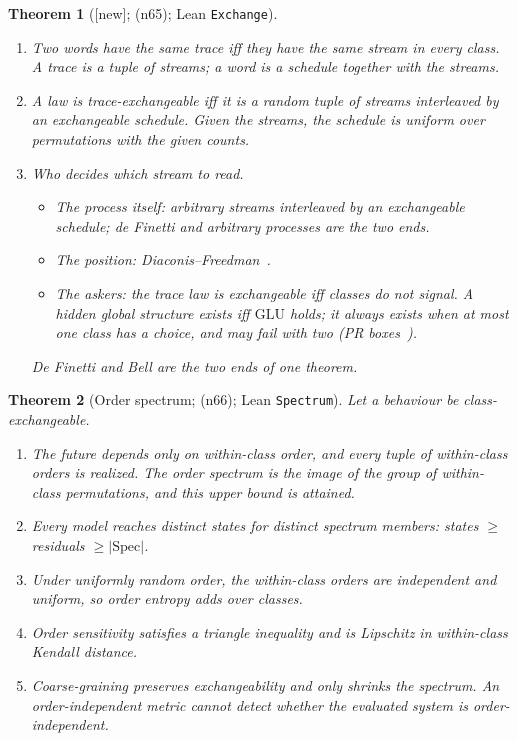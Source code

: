 \documentclass[11pt]{article}
\newtheorem{theorem}{Theorem}[section]
\theoremstyle{definition}
\theoremstyle{remark}
\newcommand{\GLU}{\mathrm{GLU}}
\newcommand{\lean}[1]{\texttt{#1}}
\newcommand{\status}[1]{\textsf{[#1]}}
\newcommand{\note}[1]{\textsf{(n#1)}}
\begin{document}
\begin{theorem}[\status{new}; \note{65}; Lean \lean{Exchange}]\label{thm:repr}
\leavevmode
\begin{enumerate}
\item Two words have the same trace iff they have the same stream in every class. A trace is a tuple of streams; a word is a schedule together with the streams.
\item A law is trace-exchangeable iff it is a random tuple of streams interleaved by an exchangeable schedule. Given the streams, the schedule is uniform over permutations with the given counts.
\item \emph{Who decides which stream to read.}
  \begin{itemize}
  \item The process itself: arbitrary streams interleaved by an exchangeable schedule; de Finetti and arbitrary processes are the two ends.
  \item The position: Diaconis--Freedman~\cite{DiaconisFreedman80}.
  \item The askers: the trace law is exchangeable iff classes do not signal. A hidden global structure exists iff $\GLU$ holds; it always exists when at most one class has a choice, and may fail with two (PR boxes~\cite{PopescuRohrlich94}).
  \end{itemize}
  De Finetti and Bell are the two ends of one theorem.
\end{enumerate}
\end{theorem}

\begin{theorem}[Order spectrum; \note{66}; Lean \lean{Spectrum}]
Let a behaviour be class-exchangeable.
\begin{enumerate}
\item The future depends only on within-class order, and every tuple of within-class orders is realized. The order spectrum is the image of the group of within-class permutations, and this upper bound is attained.
\item Every model reaches distinct states for distinct spectrum members: states $\ge$ residuals $\ge|\mathrm{Spec}|$.
\item Under uniformly random order, the within-class orders are independent and uniform, so order entropy adds over classes.
\item Order sensitivity satisfies a triangle inequality and is Lipschitz in within-class Kendall distance.
\item Coarse-graining preserves exchangeability and only shrinks the spectrum. An order-independent metric cannot detect whether the evaluated system is order-independent.
\end{enumerate}
\end{theorem}
\end{document}
